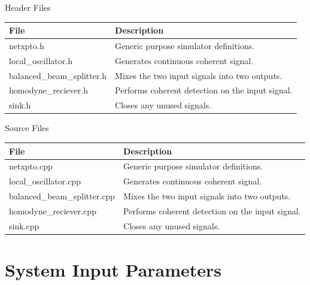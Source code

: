 \documentclass[a4paper]{article}
\begin{document}
Header Files
\begin{table}[H]
\centering
\begin{tabulary}{1.0\textwidth}{|L|L|}
\hline
\textbf{File}              & \textbf{Description} 				            \\ \hline
netxpto.h                  & Generic purpose simulator definitions.	        \\ \hline
local\_oscillator.h        & Generates continuous coherent signal.            \\ \hline
balanced\_beam\_splitter.h & Mixes the two input signals into two outputs.    \\ \hline
homodyne\_reciever.h       & Performs coherent detection on the input signal. \\ \hline
sink.h                     & Closes any unused signals.                       \\ \hline
\end{tabulary}
\end{table}
%
Source Files
\begin{table}[H]
\centering
\begin{tabulary}{1.0\textwidth}{|L|L|}
\hline
\textbf{File}                & \textbf{Description} 					          \\ \hline
netxpto.cpp                  & Generic purpose simulator definitions.	          \\ \hline
local\_oscillator.cpp        & Generates continuous coherent signal.            \\ \hline
balanced\_beam\_splitter.cpp & Mixes the two input signals into two outputs.    \\ \hline
homodyne\_reciever.cpp       & Performs coherent detection on the input signal. \\ \hline
sink.cpp                     & Closes any unused signals.                       \\ \hline
\end{tabulary}
\end{table}


\section{System Input Parameters}
\end{document}
